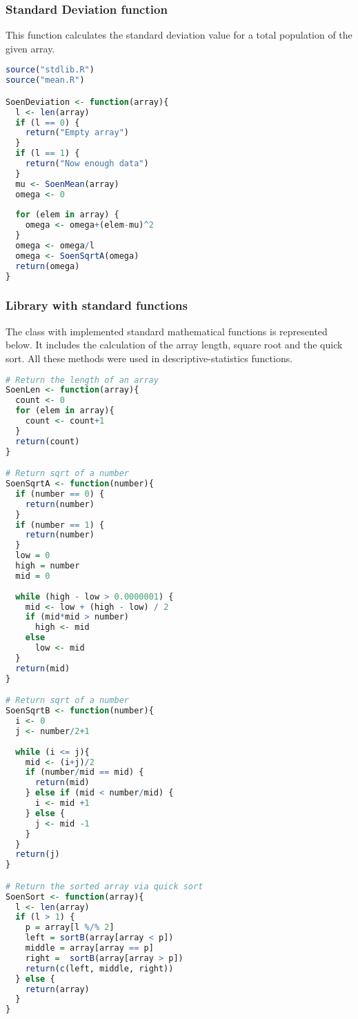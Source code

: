 \documentclass[12pt]{article}
\begin{document}
\subsubsection{Standard Deviation function}
This function calculates the standard deviation value for a total population of the given array.
\begin{lstlisting}[language=R]
source("stdlib.R")
source("mean.R")

SoenDeviation <- function(array){
  l <- len(array)
  if (l == 0) {
    return("Empty array")
  }
  if (l == 1) {
    return("Now enough data")
  }
  mu <- SoenMean(array)
  omega <- 0
  
  for (elem in array) {
    omega <- omega+(elem-mu)^2
  }
  omega <- omega/l
  omega <- SoenSqrtA(omega)
  return(omega)
}
\end{lstlisting}
\subsubsection{Library with standard functions}
The class with implemented standard mathematical functions is represented below. It includes the calculation of the array length, square root and the quick sort. All these methods were used in descriptive-statistics functions.
\begin{lstlisting}[language=R]
# Return the length of an array
SoenLen <- function(array){
  count <- 0
  for (elem in array){
    count <- count+1
  }
  return(count)
}

# Return sqrt of a number
SoenSqrtA <- function(number){
  if (number == 0) {
    return(number)
  }
  if (number == 1) {
    return(number)
  }
  low = 0
  high = number
  mid = 0
  
  while (high - low > 0.0000001) {
    mid <- low + (high - low) / 2
    if (mid*mid > number)
      high <- mid
    else
      low <- mid
  }    
  return(mid)
}

# Return sqrt of a number
SoenSqrtB <- function(number){
  i <- 0
  j <- number/2+1
  
  while (i <= j){
    mid <- (i+j)/2
    if (number/mid == mid) {
      return(mid)
    } else if (mid < number/mid) {
      i <- mid +1
    } else {
      j <- mid -1
    }
  }
  return(j)
}

# Return the sorted array via quick sort
SoenSort <- function(array){
  l <- len(array)
  if (l > 1) {
    p = array[l %/% 2]
    left = sortB(array[array < p])
    middle = array[array == p]
    right =  sortB(array[array > p])
    return(c(left, middle, right))
  } else {
    return(array)
  }
}
\end{lstlisting}
\newpage
\end{document}
